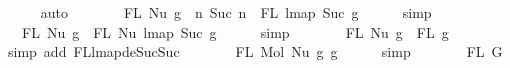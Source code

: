 \begin{isabellebody}
\ \ \ \ \isamarkupfalse%
\ auto\isanewline
\ \ \isamarkupfalse%
\ \isamarkupfalse%
\ {\isachardoublequoteopen}{\isachardot}{\kern0pt}{\isachardot}{\kern0pt}{\isachardot}{\kern0pt}\ {\isacharequal}{\kern0pt}\ FL\ {\isacharparenleft}{\kern0pt}Nu\ g{}{\isacharparenright}{\kern0pt}\ {\isasymunion}\ {\isacharbraceleft}{\kern0pt}n{\isachardot}{\kern0pt}\ Suc\ n\ {\isasymin}\ FL\ {\isacharparenleft}{\kern0pt}lmap\ Suc\ g{}{\isacharparenright}{\kern0pt}{\isacharbraceright}{\kern0pt}{\isachardoublequoteclose}\isanewline
\ \ \ \ \isamarkupfalse%
\ simp\isanewline
\ \ \isamarkupfalse%
\ \isamarkupfalse%
\ {\isachardoublequoteopen}{\isachardot}{\kern0pt}{\isachardot}{\kern0pt}{\isachardot}{\kern0pt}\ {\isacharequal}{\kern0pt}\ FL\ {\isacharparenleft}{\kern0pt}Nu\ g{}{\isacharparenright}{\kern0pt}\ {\isasymunion}\ FL\ {\isacharparenleft}{\kern0pt}Nu\ {\isacharparenleft}{\kern0pt}lmap\ Suc\ g{}{\isacharparenright}{\kern0pt}{\isacharparenright}{\kern0pt}{\isachardoublequoteclose}\isanewline
\ \ \ \ \isamarkupfalse%
\ simp\isanewline
\ \ \isamarkupfalse%
\ \isamarkupfalse%
\ {\isachardoublequoteopen}{\isachardot}{\kern0pt}{\isachardot}{\kern0pt}{\isachardot}{\kern0pt}\ {\isacharequal}{\kern0pt}\ FL\ {\isacharparenleft}{\kern0pt}Nu\ g{}{\isacharparenright}{\kern0pt}\ {\isasymunion}\ FL\ g{}{\isachardoublequoteclose}\isanewline
\ \ \ \ \isamarkupfalse%
\ {\isacharparenleft}{\kern0pt}simp\ add{\isacharcolon}{\kern0pt}\ FL{\isacharunderscore}{\kern0pt}lmap{\isacharunderscore}{\kern0pt}deSuc{\isacharunderscore}{\kern0pt}Suc{\isacharparenright}{\kern0pt}\isanewline
\ \ \isamarkupfalse%
\ \isamarkupfalse%
\ {\isachardoublequoteopen}{\isachardot}{\kern0pt}{\isachardot}{\kern0pt}{\isachardot}{\kern0pt}\ {\isacharequal}{\kern0pt}\ FL\ {\isacharparenleft}{\kern0pt}Mol\ {\isacharparenleft}{\kern0pt}Nu\ g{}{\isacharparenright}{\kern0pt}\ g{}{\isacharparenright}{\kern0pt}{\isachardoublequoteclose}\isanewline
\ \ \ \ \isamarkupfalse%
\ simp\isanewline
\ \ \isamarkupfalse%
\ \isamarkupfalse%
\ {\isachardoublequoteopen}{\isachardot}{\kern0pt}{\isachardot}{\kern0pt}{\isachardot}{\kern0pt}\ {\isacharequal}{\kern0pt}\ FL\ G{}{\isachardoublequoteclose}\isanewline
\ \ \ \ \isamarkupfalse%

\end{isabellebody}
